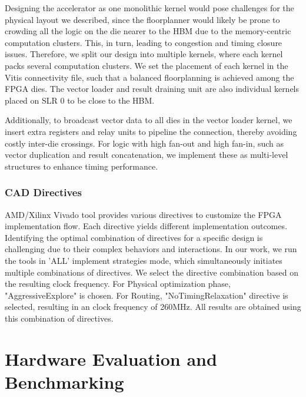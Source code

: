 \documentclass[manuscript,screen,review]{acmart}
\begin{document}
Designing the accelerator as one monolithic kernel would pose challenges for the physical layout we described, since the floorplanner would likely be prone to crowding all the logic on the die nearer to the HBM due to the memory-centric computation clusters. This, in turn, leading to congestion and timing closure issues. Therefore, we split our design into multiple kernels, where each kernel packs several computation clusters. We set the placement of each kernel in the Vitis connectivity file, such that a balanced floorplanning is achieved among the FPGA dies. The vector loader and result draining unit are also individual kernels placed on SLR 0 to be close to the HBM.

Additionally, to broadcast vector data to all dies in the vector loader kernel, we insert extra registers and relay units to pipeline the connection, thereby avoiding costly inter-die crossings. For logic with high fan-out and high fan-in, such as vector duplication and result concatenation, we implement these as multi-level structures to enhance timing performance.


\subsubsection{CAD Directives}

AMD/Xilinx Vivado tool provides various directives to customize the FPGA implementation flow. Each directive yields different implementation outcomes. Identifying the optimal combination of directives for a specific design is challenging due to their complex behaviors and interactions. In our work, we run the tools in 'ALL' implement strategies mode, which simultaneously initiates multiple combinations of directives. We select the directive combination based on the resulting clock frequency. For Physical optimization phase, "AggressiveExplore" is chosen. For Routing, "NoTimingRelaxation" directive is selected, resulting in an clock frequency of 260MHz. All results are obtained using this combination of directives.




\section{ Hardware Evaluation and Benchmarking}
\end{document}
